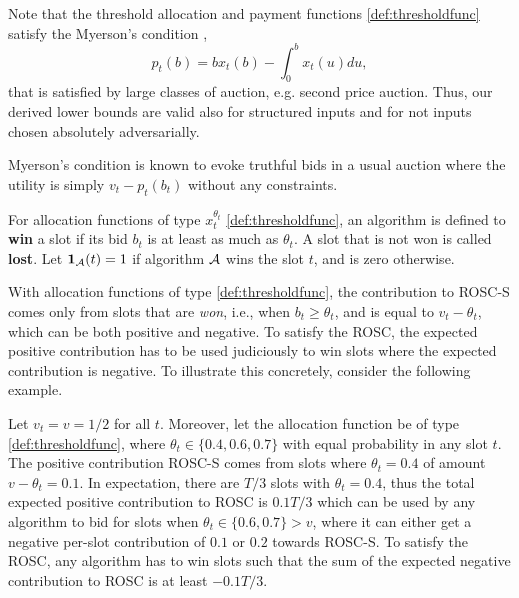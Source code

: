 Note that the threshold allocation and payment functions \eqref{def:thresholdfunc} satisfy the Myerson's
condition \cite{myerson1981optimal}, %
\begin{equation}\label{eq:myersontruthfulcond}
p_t(b) = b x_t(b) - \int_0^b x_t(u) du,
\end{equation}
that is satisfied by large classes of auction, e.g. second price auction. Thus, our derived lower bounds are valid also for structured inputs and for not inputs chosen absolutely adversarially.

 \begin{rem} Myerson's
condition is known to evoke truthful bids in a usual auction where the utility is simply $v_t-p_t(b_t)$ without any constraints. 
\end{rem}



\begin{definition}\label{defn:slotwin}
For allocation functions of type $x_t^{\theta_t}$ \eqref{def:thresholdfunc}, 
an algorithm is defined to {\bf win} a slot if its bid $b_t$ is at least as much as $\theta_t$. A slot that is not won is called {\bf lost}. Let $\b1_{\cA}(t)=1$ if algorithm $\mathcal{A}$ wins the slot $t$, and is zero otherwise.
\end{definition}
With allocation functions of type \eqref{def:thresholdfunc}, the contribution to ROSC-S comes only from slots that are {\it won}, i.e., when  $b_t\ge \theta_t$, and is equal to $v_t - \theta_t$, which can be both positive and negative. To satisfy the ROSC, the expected positive contribution has to be used judiciously to win slots where the expected contribution is negative.
To illustrate this concretely, consider the following example.
\begin{example}\label{exm:1}
Let $v_t=v=1/2$ for all $t$. Moreover, let the allocation function be of type  \eqref{def:thresholdfunc}, where  $\theta_t \in \{0.4, 0.6, 0.7\}$ with equal probability in any slot $t$. The positive contribution ROSC-S comes from slots where $\theta_t=0.4$ of amount $v-\theta_t=0.1$.
In expectation, there are $T/3$ slots with  $\theta_t=0.4$, thus the total expected positive contribution to ROSC is $0.1 T/3$ which can be 
used by any algorithm to bid for slots when $\theta_t\in \{0.6, 0.7\} > v$, where it can either get a negative per-slot contribution of $0.1$ or $0.2$ towards ROSC-S. To satisfy the ROSC, any algorithm has to win slots such that the sum of the expected negative contribution to ROSC is at least $-0.1 T/3$.
\end{example}
